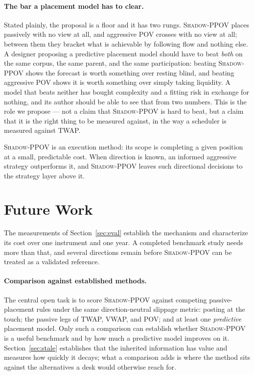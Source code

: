 \documentclass[11pt]{article}
\newcommand{\pov}{\textsc{Shadow-PPOV}}
\begin{document}
\paragraph{The bar a placement model has to clear.} Stated plainly, the proposal
is a floor and it has two rungs. \pov{} places passively with no view at all,
and aggressive POV crosses with no view at all; between them they bracket what
is achievable by following flow and nothing else. A designer proposing a
predictive placement model should have to beat \emph{both} on the same corpus,
the same parent, and the same participation: beating \pov{} shows the forecast is
worth something over resting blind, and beating aggressive POV shows it is worth
something over simply taking liquidity. A model that beats neither has bought
complexity and a fitting risk in exchange for nothing, and its author should be
able to see that from two numbers. This is the role we propose --- not a claim
that \pov{} is hard to beat, but a claim that it is the right thing to be
measured against, in the way a scheduler is measured against TWAP.

\pov{} is an execution method: its scope is completing a given position at a
small, predictable cost. When direction is known, an informed aggressive
strategy outperforms it, and \pov{} leaves such directional decisions to the
strategy layer above it.

\section{Future Work}
\label{sec:future}

The measurements of Section~\ref{sec:eval} establish the mechanism and
characterize its cost over one instrument and one year. A completed benchmark
study needs more than that, and several directions remain before \pov{} can be
treated as a validated reference.

\paragraph{Comparison against established methods.} The central open task is to
score \pov{} against competing passive-placement rules under the same
direction-neutral slippage metric: posting at the touch; the passive legs of
TWAP, VWAP, and POV; and at least one \emph{predictive} placement model. Only
such a comparison can establish whether \pov{} is a useful benchmark and by how
much a predictive model improves on it. Section~\ref{sec:stale} establishes that
the inherited information has value and measures how quickly it decays; what a
comparison adds is where the method sits against the alternatives a desk would
otherwise reach for.
\end{document}
